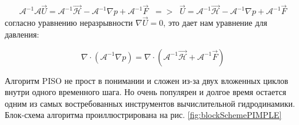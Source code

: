\begin{equation}
    \mathcal{A}^{-1} \mathcal{A} \vec{U} = \mathcal{A}^{-1} \mathcal{\vec{H}} - \mathcal{A}^{-1} \nabla p + \mathcal{A}^{-1} \vec{F} \;\;=>\;\;
    \vec{U} = \mathcal{A}^{-1} \mathcal{\vec{H}} - \mathcal{A}^{-1} \nabla p + \mathcal{A}^{-1} \vec{F}
\end{equation}
согласно уравнению неразрывности $\nabla \vec{U} = 0$, это дает нам уравнение для давления:

\begin{equation}
    \nabla \cdot (\mathcal{A}^{-1} \nabla p) = \nabla \cdot (\mathcal{A}^{-1} \mathcal{\vec{H}} + \mathcal{A}^{-1} \vec{F})
\end{equation}

Алгоритм PISO не прост в понимании и сложен из-за двух вложенных циклов внутри одного временного шага. Но очень популярен и долгое время остается одним из самых востребованных инструментов вычислительной  гидродинамики. Блок-схема алгоритма проиллюстрирована на рис. \ref{fig:blockSchemePIMPLE}

